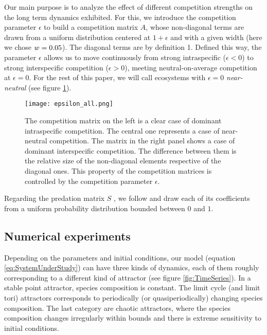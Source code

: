 Our main purpose is to analyze the effect of different competition strengths on the long term dynamics exhibited. For this, we introduce the competition parameter $\epsilon$ to build a competition matrix $A$, whose non-diagonal terms are drawn from a uniform distribution centered at $1+\epsilon$ and with a given width (here we chose $ w = 0.05$). The diagonal terms are by definition 1. Defined this way, the parameter $\epsilon$ allows us to move continuously from strong intraspecific ($ \epsilon < 0$) to strong interspecific competition ($ \epsilon > 0$), meeting neutral-on-average competition at $\epsilon = 0$. For the rest of this paper, we will call ecosystems with $ \epsilon = 0$ \textit{near-neutral} (see figure \ref{fig:CompetitionParameter}).

\begin{figure}[H]
	\begin{center}
		\texttt{[image: epsilon\_all.png]}
	\end{center}
	\caption{The competition matrix on the left is a clear case of dominant intraspecific competition. The central one represents a case of near-neutral competition. The matrix in the right panel shows a case of dominant interspecific competition. The difference between them is the relative size of the non-diagonal elements respective of the diagonal ones. This property of the competition matrices is controlled by the competition parameter $\epsilon$.}
	\label{fig:CompetitionParameter}
\end{figure}

Regarding the predation matrix $S$ , we follow \citet{Dakos2009b} and draw each of its coefficients from a uniform probability distribution bounded between $0$ and $1$.

\subsection{Numerical experiments}
\label{subsec:NumericalExperiment}

Depending on the parameters and initial conditions, our model (equation \eqref{eq:SystemUnderStudy}) can have three kinds of dynamics, each of them roughly corresponding to a different kind of attractor (see figure \ref{fig:TimeSeries}). In a stable point attractor, species composition is constant. The limit cycle (and limit tori) attractors corresponds to periodically (or quasiperiodically) changing species composition. The last category are chaotic attractors, where the species composition changes irregularly within bounds and there is extreme sensitivity to initial conditions. 

